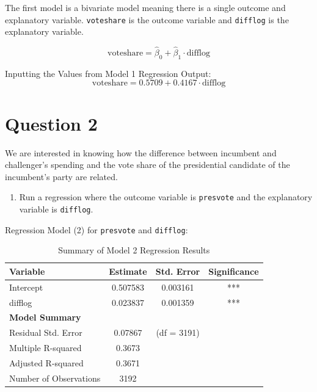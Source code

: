 \documentclass[12pt,letterpaper]{article}
\begin{document}
\vspace{0.25cm}
\noindent The first model is a bivariate model meaning there is a single outcome and explanatory variable.  \texttt{voteshare} is the outcome variable and  \texttt{difflog} is the explanatory variable. 

\begin{equation}
	{\text{voteshare}} = \hat{\beta}_0 + \hat{\beta}_1 \cdot \text{difflog}
\end{equation}

\vspace{0.5cm} \noindent Inputting the Values from Model 1 Regression Output:
\begin{equation}
	{\text{voteshare}} = 0.5709 + 0.4167 \cdot \text{difflog}
\end{equation}
	
\newpage

\section*{Question 2}
\noindent We are interested in knowing how the difference between incumbent and challenger's spending and the vote share of the presidential candidate of the incumbent's party are related.	\vspace{.25cm}
\noindent\begin{enumerate}[left=0pt]
\item Run a regression where the outcome variable is \texttt{presvote} and the explanatory variable is \texttt{difflog}.
\end{enumerate}
\vspace{0.5cm}	
\noindent Regression Model (2) for \texttt{presvote} and \texttt{difflog}:
\noindent

\begin{table}[h!]
	\centering
	\caption{Summary of Model 2 Regression Results}
	\vspace{0.25cm}
	\begin{tabular}{lccc}
		\toprule
		\textbf{Variable} & \textbf{Estimate} & \textbf{Std. Error} & \textbf{Significance} \\ 
		\midrule
		Intercept              & 0.507583 & 0.003161 & *** \\ 
		difflog                & 0.023837 & 0.001359 & *** \\ 
		\midrule
		\textbf{Model Summary} & & & \\
		Residual Std. Error    & 0.07867  & (df = 3191) & \\ 
		Multiple R-squared     & 0.3673   & & \\ 
		Adjusted R-squared     & 0.3671   & & \\ 
		Number of Observations & 3192     & & \\ 
		\bottomrule
	\end{tabular}
\end{table}
\end{document}
